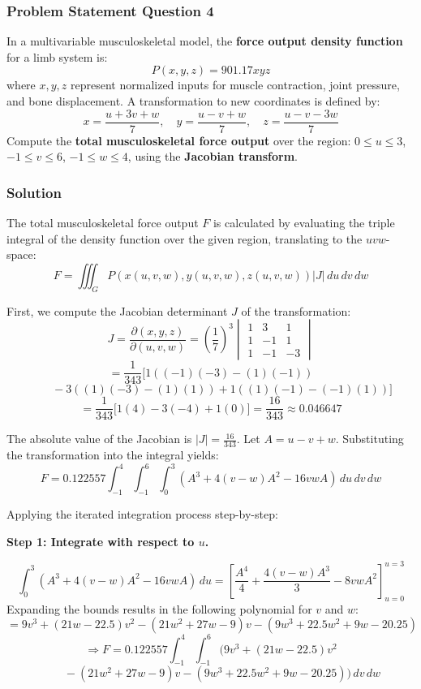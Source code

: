 \subsubsection*{Problem Statement Question 4}
In a multivariable musculoskeletal model, the \textbf{force output density function} for a limb system is:
\[ P(x, y, z) = 901.17xyz \]
where $x, y, z$ represent normalized inputs for muscle contraction, joint pressure, and bone displacement. A transformation to new coordinates is defined by:
\[ x=\frac{u+3v+w}{7}, \quad y=\frac{u-v+w}{7}, \quad z=\frac{u-v-3w}{7} \]
Compute the \textbf{total musculoskeletal force output} over the region:
$0 \le u \le 3$, $-1 \le v \le 6$, $-1 \le w \le 4$, using the \textbf{Jacobian transform}.

\subsubsection*{Solution}
The total musculoskeletal force output $F$ is calculated by evaluating the triple integral of the density function over the given region, translating to the $uvw$-space:
\[ F = \iiint_{G} P(x(u,v,w), y(u,v,w), z(u,v,w)) |J| \, du \, dv \, dw \]

First, we compute the Jacobian determinant $J$ of the transformation:
\[ J = \frac{\partial(x,y,z)}{\partial(u,v,w)} = \left(\frac{1}{7}\right)^3 \begin{vmatrix} 1 & 3 & 1 \\ 1 & -1 & 1 \\ 1 & -1 & -3 \end{vmatrix} \]
\[ = \frac{1}{343} \Big[ 1((-1)(-3) - (1)(-1)) \]
		\[ \qquad - 3((1)(-3) - (1)(1)) + 1((1)(-1) - (-1)(1)) \Big] \]
\[ = \frac{1}{343} \Big[ 1(4) - 3(-4) + 1(0) \Big] = \frac{16}{343} \approx 0.046647 \]

The absolute value of the Jacobian is $|J| = \frac{16}{343}$. Let $A = u - v + w$. Substituting the transformation into the integral yields:
\[ F = 0.122557 \int_{-1}^{4} \int_{-1}^{6} \int_{0}^{3} \left( A^3 + 4(v-w)A^2 - 16vwA \right) \, du \, dv \, dw \]

Applying the iterated integration process step-by-step:

\vspace{1cm}
\noindent\textbf{Step 1: Integrate with respect to $u$.}

\[ \int_{0}^{3} \left( A^3 + 4(v-w)A^2 - 16vwA \right) \, du = \left[ \frac{A^4}{4} + \frac{4(v-w)A^3}{3} - 8vwA^2 \right]_{u=0}^{u=3} \]
Expanding the bounds results in the following polynomial for $v$ and $w$:
\[ = 9v^3 + (21w - 22.5)v^2 - (21w^2 + 27w - 9)v - (9w^3 + 22.5w^2 + 9w - 20.25) \]
\[ \Rightarrow F = 0.122557 \int_{-1}^{4} \int_{-1}^{6} \Big( 9v^3 + (21w - 22.5)v^2 \]
\[ \qquad - (21w^2 + 27w - 9)v - (9w^3 + 22.5w^2 + 9w - 20.25) \Big) \, dv \, dw \]

